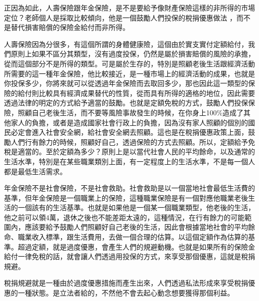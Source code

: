 \documentclass[]{ctexbook}
\begin{document}
正因為如此，人壽保險跟年金保險，是不是要給予像財產保險這樣的非所得的市場定位？老師個人是採取比較傾向，他是一個鼓勵人們投保的稅捐優惠做法
，而不是替代損害賠償的保險金給付而非所得。

人壽保險因為分很多，有這個所謂的身體健康險，這個由於實支實付定額給付，我們原則上如果不區分其類型，沒有過度投保，仍然是屬於損害賠償的風險的承擔，從而這個部分不是所得的類型。可是屬於生存的，特別是照顧老後生活跟經濟活動所需要的這一種年金保險，他比較接近，是一種市場上的經濟活動的成果，也就是你投保多少，你將來就可以從透過年金保險而去取回多少，那也因此這一類型的保險的給付則比較具有經濟成果替代的性質，從而具有所得的適格的地位，因此需要透過法律的明定的方式給予適當的鼓勵。也就是定額免稅的方式，鼓勵人們投保保險，照顧自己老後生活，而不要等風險事故發生的時候，在你身上100\%造成了其他家人的負擔，或者是造成國家社會行政上的負擔，因為沒有家人照顧的個別的國民必定會進入社會安全網，給社會安全網去照顧。這也是在稅捐優惠政策上面，鼓勵人們行有餘力的時候，照顧好自己，透過保險的方式去照顧。所以，定額給予免稅是適當的。至於定額為多少？原則上是以當代社會人民的平均餘命，以及通常的生活水準，特別是在某些職業類別上面，有一定程度上的生活水準，不是每一個人都是最低生活需求。

年金保險不是社會保險，不是社會救助。社會救助是以一個當地社會最低生活費的基準，但年金保險是一個職業上的保險，這種職業保險是有一個對應他職業老後生活的一個該有的生活基準。也就是如果他是一個某一個職業類型，他老後的生活，他之前可以領4萬，退休之後也不能差距太遠的，這種情況，在行有餘力的可能範圍內，應該要給予鼓勵人們照顧好自己老後的生活，因此會根據當地社會的平均餘命、職業收入標準，跟生活費用，去做一個合理的估算。以這個定額作為估算的基準。超過定額，就是過度優惠，會產生人們的規避動機。也就是如果所有的保險金給付一律免稅的話，就會讓人們透過用投保的方式，來享受那個優惠，這就是稅捐規避。

稅捐規避就是一種由於過度優惠措施而產生出來，人們透過私法形成來享受稅捐優惠的一種狀態。是立法者給的，不然他不會去起心動念想要獲得那個利益。
\end{document}
